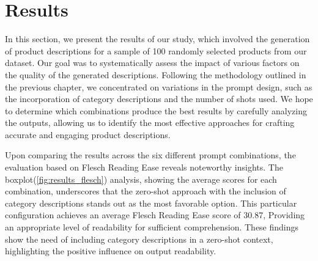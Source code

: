 \chapter{Results}\label{chap:results}



In this section, we present the results of our study, which involved the generation of product descriptions for a sample of 100 randomly selected products from our dataset. Our goal was to systematically assess the impact of various factors on the quality of the generated descriptions. Following the methodology outlined in the previous chapter, we concentrated on variations in the prompt design, such as the incorporation of category descriptions and the number of shots used. We hope to determine which combinations produce the best results by carefully analyzing the outputs, allowing us to identify the most effective approaches for crafting accurate and engaging product descriptions.


Upon comparing the results across the six different prompt combinations, the evaluation based on Flesch Reading Ease reveals noteworthy insights. The boxplot(\autoref{fig:results_flesch}) analysis, showing the average scores for each combination, underscores that the zero-shot approach with the inclusion of category descriptions stands out as the most favorable option. This particular configuration achieves an average Flesch Reading Ease score of 30.87, Providing an appropriate level of readability for sufficient comprehension. These findings show the need of including category descriptions in a zero-shot context, highlighting the positive influence on output readability.



